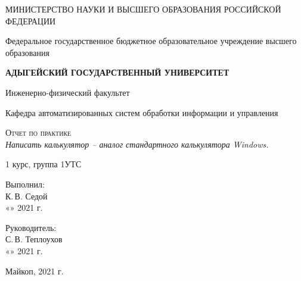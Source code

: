 \documentclass[12pt,a4paper]{scrartcl}
\begin{document}
	\begin{titlepage}
		\begin{center}
			\large
			МИНИСТЕРСТВО НАУКИ И ВЫСШЕГО ОБРАЗОВАНИЯ РОССИЙСКОЙ ФЕДЕРАЦИИ
			
			Федеральное государственное бюджетное образовательное учреждение высшего образования
			
			\textbf{АДЫГЕЙСКИЙ ГОСУДАРСТВЕННЫЙ УНИВЕРСИТЕТ}
			\vspace{0.25cm}
			
			Инженерно-физический факультет
			
			Кафедра автоматизированных систем обработки информации и управления
			\vfill

			\vfill
			
			\textsc{Отчет по практике}\\[5mm]
			
			{\LARGE \textit{Написать калькулятор – аналог стандартного калькулятора Windows.}}
			\bigskip
			
			1 курс, группа 1УТС
		\end{center}
		\vfill
		
		\newlength{\ML}
		\hfill\begin{minipage}{0.5\textwidth}
			Выполнил:\\
			\underline{\hspace{\ML}} К.\,В. Седой\\
			«\underline{\hspace{0.7cm}}» \underline{\hspace{2cm}} 2021 г.
		\end{minipage}%
		\bigskip
		
		\hfill\begin{minipage}{0.5\textwidth}
			Руководитель:\\
			\underline{\hspace{\ML}} С.\,В. Теплоухов\\
			«\underline{\hspace{0.7cm}}» \underline{\hspace{2cm}} 2021 г.
		\end{minipage}%
		\vfill
		
		\begin{center}
			Майкоп, 2021 г.
		\end{center}
	\end{titlepage}
\end{document}
